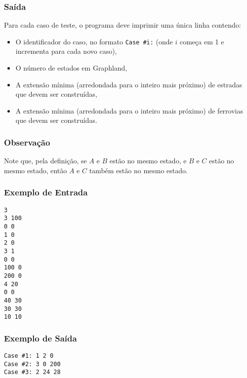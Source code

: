 \subsubsection*{Saída}
Para cada caso de teste, o programa deve imprimir uma única linha contendo:
\begin{itemize}
    \item O identificador do caso, no formato \texttt{Case \#i:} (onde \(i\) começa em 1 e incrementa para cada novo caso),
    \item O número de estados em Graphland,
    \item A extensão mínima (arredondada para o inteiro mais próximo) de estradas que devem ser construídas,
    \item A extensão mínima (arredondada para o inteiro mais próximo) de ferrovias que devem ser construídas.
\end{itemize}

\subsubsection*{Observação}
Note que, pela definição, se \(A\) e \(B\) estão no mesmo estado, e \(B\) e \(C\) estão no mesmo estado, então \(A\) e \(C\) também estão no mesmo estado.

\subsubsection*{Exemplo de Entrada}
\begin{verbatim}
3
3 100
0 0
1 0
2 0
3 1
0 0
100 0
200 0
4 20
0 0
40 30
30 30
10 10
\end{verbatim}

\subsubsection*{Exemplo de Saída}
\begin{verbatim}
Case #1: 1 2 0
Case #2: 3 0 200
Case #3: 2 24 28
\end{verbatim}


